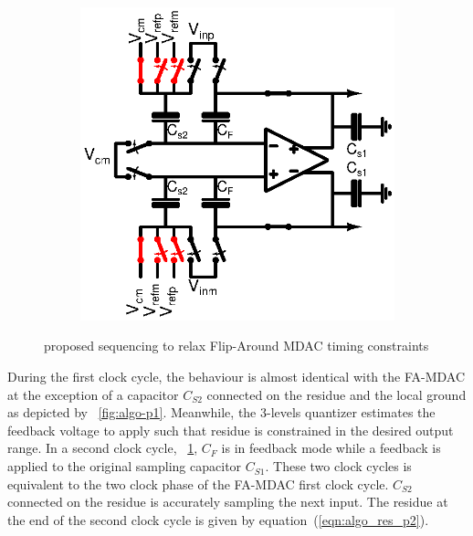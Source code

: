 \begin{figure}[htp]
\begin{subfigure}[b]{0.32\textwidth}
		\label{fig:algo-p2}
	\end{subfigure}
	\begin{subfigure}[b]{0.32\textwidth}
		\centering
		\includegraphics[width=\textwidth]{Chapter4/Figs/algorithmic-mdac-p3.ps}
		\label{fig:algo-p3}
	\end{subfigure}
	\caption{proposed sequencing to relax Flip-Around MDAC timing constraints}
	\label{fig:algo-seq-proposed}
\end{figure}

During the first clock cycle, the behaviour is almost identical with the FA-MDAC at the exception of a capacitor \(C_{S2}\) connected on the residue and the local ground as depicted by \figurename~\ref{fig:algo-p1}. Meanwhile, the 3-levels quantizer estimates the feedback voltage to apply such that residue is constrained in the desired output range. In a second clock cycle, \figurename~\ref{fig:algo-p2}, \(C_F\) is in feedback mode while a feedback is applied to the original sampling capacitor \(C_{S1}\). These two clock cycles is equivalent to the two clock phase of the FA-MDAC first clock cycle. \(C_{S2}\) connected on the residue is accurately sampling the next input. The residue at the end of the second clock cycle is given by equation~(\ref{eqn:algo_res_p2}).

